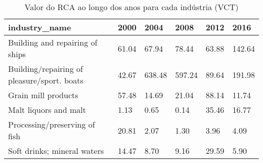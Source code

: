 \begin{table}
\centering
\caption{Valor do RCA ao longo dos anos para cada indústria (VCT)}
\begin{tabular}{p{6cm}p{1.5cm}p{1.5cm}p{1.5cm}p{1.5cm}p{1.5cm}}
\toprule
                              industry\_name &  2000 &   2004 &   2008 &  2012 &   2016 \\
\midrule
            Building and repairing of ships & 61.04 &  67.94 &  78.44 & 63.88 & 142.64 \\
Building/repairing of pleasure/sport. boats & 42.67 & 638.48 & 597.24 & 89.64 & 191.98 \\
                        Grain mill products & 57.48 &  14.69 &  21.04 & 88.14 &  11.74 \\
                      Malt liquors and malt &  1.13 &   0.65 &   0.14 & 35.46 &  16.77 \\
              Processing/preserving of fish & 20.81 &   2.07 &   1.30 &  3.96 &   4.09 \\
                Soft drinks; mineral waters & 14.47 &   8.70 &   9.16 & 29.59 &   5.90 \\
\bottomrule
\end{tabular}
\end{table}
